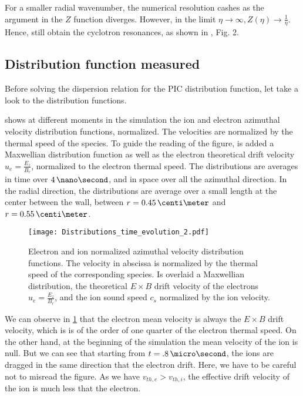     For a smaller radial wavenumber, the numerical resolution cashes as the argument in the $Z$ function diverges.
    However, in the limit $\eta \rightarrow \infty, Z(\eta) \rightarrow  \frac{1}{\eta}$.
    Hence, still obtain the cyclotron resonances, as shown in \citet{janhunen2018}, Fig. 2.

  \subsection{Distribution function measured} \label{subsec-VDFpic}
  
  Before solving the dispersion relation for the \ac{PIC} distribution function, let take a look to the distribution functions.
  
   shows at different moments in the simulation the ion and electron azimuthal velocity distribution functions, normalized.
  The velocities are normalized by the thermal speed of the species.
  To guide the reading of the figure, is added a Maxwellian distribution function as well as the electron theoretical drift velocity $u_e = \frac{E_z}{B_r}$, normalized to the electron thermal speed.
  The distributions are averages in time over $4\,\nano\second$, and in space over all the azimuthal direction.
  In the radial direction, the distributions are average over a small length at the center between the wall, between $r=0.45\,\centi\meter$ and $r=0.55\,\centi\meter$.
  
  \begin{figure}[hbtp]
    \centering
    \texttt{[image: Distributions\_time\_evolution\_2.pdf]}
    \caption{Electron and ion normalized azimuthal velocity distribution functions. The velocity in abscissa is normalized by the thermal speed of the corresponding species. Is overlaid a Maxwellian distribution, the theoretical $E\times B$ drift velocity of the electrons $u_e = \frac{E_z}{B_r}$, and the ion sound speed $c_s$ normalized by the ion velocity.}
    \label{fig-vdfs_pic_time}
  \end{figure}
  
  We can observe in \cref{fig-vdfs_pic_time} that the electron mean velocity is always the $E \times B$ drift velocity, which is is of the order of one quarter of the electron thermal speed.
  On the other hand, at the beginning of the simulation the mean velocity of the ion is null.
  But we can see that starting from $t=.8\,\micro\second$, the ions are dragged in the same direction that the electron drift.
  Here, we have to be careful not to misread the figure.
  As we have $v_{th, e} > v_{th, i}$, the effective drift velocity of the ion is much less that the electron.
  
